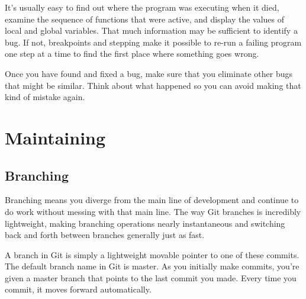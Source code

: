 \documentclass[draftclsnofoot,journal,onecolumn,12pt]{IEEEtran}
\begin{document}
It's usually easy to find out where the program was executing when it died, examine the sequence of functions that were active, and display the values of local and global variables. That much information may be sufficient to identify a bug. If not, breakpoints and stepping make it possible to re-run a failing program one step at a time to find the first place where something goes wrong.

Once you have found and fixed a bug, make sure that you eliminate other bugs that might be similar. Think about what happened so you can avoid making that kind of mistake again.

\section{Maintaining}


\subsection{Branching}
Branching means you diverge from the main line of development and continue to do work without messing with that main line. The way Git branches is incredibly lightweight, making branching operations nearly instantaneous and switching back and forth between branches generally just as fast.

A branch in Git is simply a lightweight movable pointer to one of these commits. The default branch name in Git is master. As you initially make commits, you’re given a master branch that points to the last commit you made. Every time you commit, it moves forward automatically.
\end{document}
